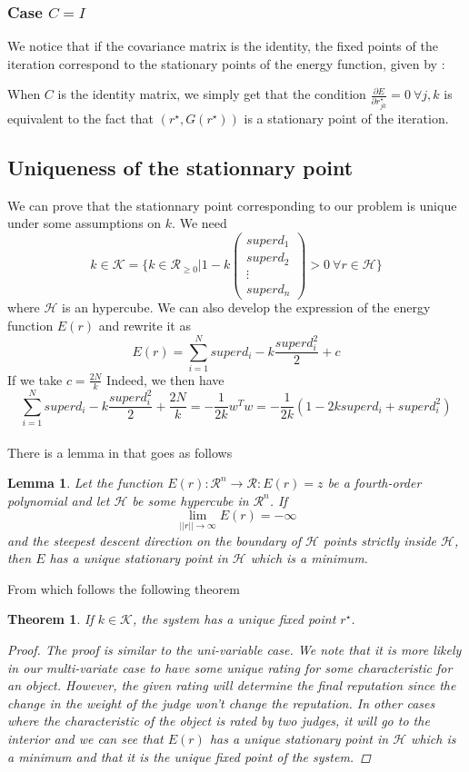 \documentclass[12pt,a4paper,notitlepage]{article}
\newtheorem{lemma}{Lemma}
\newtheorem{theorem}{Theorem}
\begin{document}
\subsubsection*{Case $C = I$}
We notice that if the covariance matrix is the identity, the fixed points of the iteration correspond to the stationary points of the energy function, given by :

When $C$ is the identity matrix, we simply get that the condition $\frac{\partial E}{\partial r^{\star}_{jk}}=0 \: \forall j,k$ is equivalent to the fact that $(r^{\star},G(r^{\star}))$ is a stationary point of the iteration.


\subsection{Uniqueness of the stationnary point}

We can prove that the stationnary point corresponding to our problem is unique under some assumptions on $k$.
We need $$k\in \mathcal{K} = \{k\in \mathcal{R}_{\geq 0} | 1 - k \begin{pmatrix} superd_1 \\ superd_2 \\ \vdots \\ superd_n \end{pmatrix} >0 \: \forall r \in \mathcal{H} \}$$
where $\mathcal{H}$ is an hypercube. We can also develop the expression of the energy function $E(r)$ and rewrite it as
$$ E(r) = \sum_{i=1}^N superd_i - k \frac{superd_i^2}{2} + c$$
If we take $c = \frac{2N}{k}$
Indeed, we then have $$ \sum_{i=1}^N superd_i - k \frac{superd_i^2}{2} + \frac{2N}{k} = -\frac{1}{2k} w^Tw = -\frac{1}{2k}(1 - 2ksuperd_i + superd_i^2)$$
\\

There is a lemma in \cite{Cristo1} that goes as follows
\begin{lemma}
Let the function $E(r) : \mathcal{R}^n \rightarrow \mathcal{R} : E(r) = z $ be a fourth-order polynomial and let $\mathcal{H}$ be some hypercube in $\mathcal{R}^n$. If 
$$\lim_{||r||\rightarrow \infty} E(r) = - \infty $$
and the steepest descent direction on the boundary of $\mathcal{H}$ points strictly inside $\mathcal{H}$, then $E$ has a unique stationary point in $\mathcal{H}$ which is a minimum.
\end{lemma}
From which follows the following theorem
\begin{theorem}
If $k \in \mathcal{K}$, the system has a unique fixed point $r^{\star}$.
\begin{proof}
The proof is similar to the uni-variable case. We note that it is more likely in our multi-variate case to have some unique rating for some characteristic for an object. However, the given rating will determine the final reputation since the change in the weight of the judge won't change the reputation. In other cases where the characteristic of the object is rated by two judges, it will go to the interior and we can see that $E(r)$ has a unique stationary point in $\mathcal{H}$ which is a minimum and that it is the unique fixed point of the system.
\end{proof}
\end{theorem}




\nocite{*}
\end{document}
